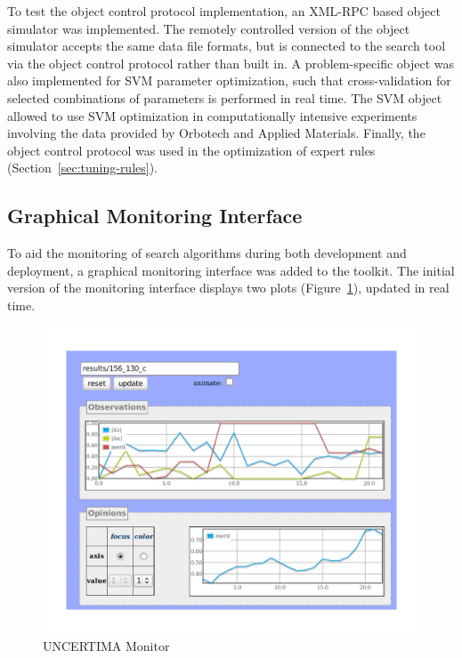 \documentclass{article}
\begin{document}
To test the object control protocol implementation, an XML-RPC based
object simulator was implemented. The remotely controlled version of
the object simulator accepts the same data file formats, but is connected
to the search tool via the object control protocol rather than built
in. A problem-specific object was also implemented for SVM parameter
optimization, such that cross-validation for selected combinations of
parameters is performed in real time. The SVM object allowed to use
SVM optimization in computationally intensive experiments involving
the data provided by Orbotech and Applied Materials. Finally, the
object control protocol was used in the optimization of expert
rules (Section~\ref{sec:tuning-rules}).

\subsection{Graphical Monitoring Interface}

To aid the monitoring of search algorithms during both development and
deployment, a graphical monitoring interface was added to the
toolkit. The initial version of the monitoring interface displays
two plots (Figure~\ref{fig:monitor-screenshot}), updated in real
time. 

\begin{figure}[h]
\centering
\includegraphics[scale=0.75]{monitor-screenshot.pdf}
\caption{UNCERTIMA Monitor}
\label{fig:monitor-screenshot}
\end{figure}
\end{document}
